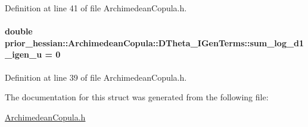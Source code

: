 Definition at line 41 of file Archimedean\+Copula.\+h.

\paragraph[{\texorpdfstring{sum\+\_\+log\+\_\+d1\+\_\+igen\+\_\+u}{sum_log_d1_igen_u}}]{\setlength{\rightskip}{0pt plus 5cm}double prior\+\_\+hessian\+::\+Archimedean\+Copula\+::\+D\+Theta\+\_\+\+I\+Gen\+Terms\+::sum\+\_\+log\+\_\+d1\+\_\+igen\+\_\+u = 0}\hypertarget{structprior__hessian_1_1ArchimedeanCopula_1_1DTheta__IGenTerms_aa92089ec503423453715423320611ac6}{}\label{structprior__hessian_1_1ArchimedeanCopula_1_1DTheta__IGenTerms_aa92089ec503423453715423320611ac6}


Definition at line 39 of file Archimedean\+Copula.\+h.



The documentation for this struct was generated from the following file\+:\begin{DoxyCompactItemize}
\item 
\hyperlink{ArchimedeanCopula_8h}{Archimedean\+Copula.\+h}\end{DoxyCompactItemize}

